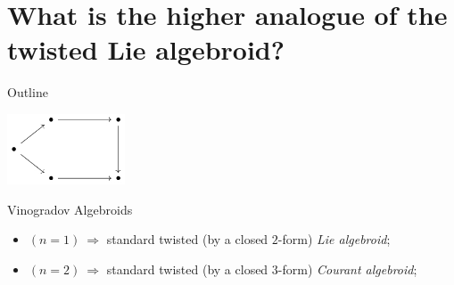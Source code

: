 \documentclass[10pt]{beamer}
\renewcommand{\checkpoint}[0]{
	\setcounter{tocdepth}{1}
	\addtocounter{framenumber}{-1}
 	\begin{frame}[t]{Outline}
  		\tableofcontents[currentsection]
		\begin{center}
			\includegraphics[width=3.5cm]{Pictures/Figure_pentagondiagm_page}
		\end{center}
	\end{frame}
}
\begin{document}
\section{What is the \textbf{higher analogue} of the \textbf{twisted Lie algebroid}?}
\checkpoint	

\begin{frame}[t]{Vinogradov Algebroids}
	\begin{defblock}
				
	\end{defblock}
	\vfill
	\begin{itemize}
		\item<5-> $(n=1) ~ \Rightarrow$ standard twisted {\small \color{UniGreen} (by a closed $2$-form)}  \emph{Lie algebroid};
		\item<5-> $(n=2) ~ \Rightarrow$ standard twisted {\small \color{UniGreen} (by a closed $3$-form)} \emph{Courant algebroid};
	\end{itemize}

\end{frame}
\end{document}
